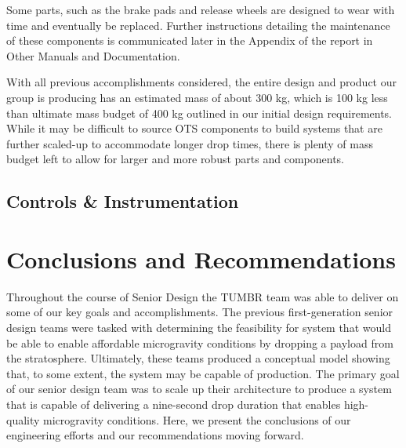 Some parts, such as the brake pads and release wheels are designed to wear with time and eventually be replaced. Further instructions detailing the maintenance of these components is communicated later in the Appendix of the report in Other Manuals and Documentation. 

With all previous accomplishments considered, the entire design and product our group is producing has an estimated mass of about 300 kg, which is 100 kg less than ultimate mass budget of 400 kg outlined in our initial design requirements. While it may be difficult to source OTS components to build systems that are further scaled-up to accommodate longer drop times, there is plenty of mass budget left to allow for larger and more robust parts and components. 


\subsection{Controls \& Instrumentation}





\section{Conclusions and Recommendations}

\indent\indent Throughout the course of Senior Design the TUMBR team was able to deliver on some of our key goals and accomplishments. The previous first-generation senior design teams were tasked with determining the feasibility for system that would be able to enable affordable microgravity conditions by dropping a payload from the stratosphere. Ultimately, these teams produced a conceptual model showing that, to some extent, the system may be capable of production. The primary goal of our senior design team was to scale up their architecture to produce a system that is capable of delivering a nine-second drop duration that enables high-quality microgravity conditions. Here, we present the conclusions of our engineering efforts and our recommendations moving forward.

